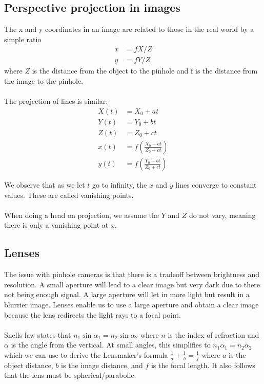\documentclass{article}
\begin{document}
\subsection*{Perspective projection in images}
The x and y coordinates in an image are related to those in the real world by a simple ratio
\begin{align*}
    x &= f X/Z \\
    y &= f Y/Z
\end{align*}
where $Z$ is the distance from the object to the pinhole and f is the distance from the image to the pinhole.
\\
\\
The projection of lines is similar:
\begin{align*}
    X(t) &= X_0 + at \\
    Y(t) &= Y_0 + bt \\
    Z(t) &= Z_0 + ct \\
    x(t) &= f\left(\frac{X_0 + at}{Z_0 + ct}\right)\\
    y(t) &= f\left(\frac{Y_0 + bt}{Z_0 + ct}\right)
\end{align*}

We observe that as we let $t$ go to infinity, the $x$ and $y$ lines converge to constant values. These are called vanishing points.
\\
\\
When doing a head on projection, we assume the $Y$ and $Z$ do not vary, meaning there is only a vanishing point at $x$.
\subsection*{Lenses}
The issue with pinhole cameras is that there is a tradeoff between brightness and resolution. A small aperture will lead to a clear image but very dark due to there not being enough signal. A large aperture will let in more light but result in a blurrier image. Lenses enable us to use a large aperture and obtain a clear image because the lens redirects the light rays to a focal point.
\\
\\
Snells law states that $n_1 \sin \alpha_1 = n_2 \sin \alpha_2$ where $n$ is the index of refraction and $\alpha$ is the angle from the vertical. At small angles, this simplifies to $n_1 \alpha_1 = n_2 \alpha_2$ which we can use to derive the Lensmaker's formula $\frac{1}{a} + \frac{1}{b} = \frac{1}{f}$ where $a$ is the object distance, $b$ is the image distance, and $f$ is the focal length. It also follows that the lens must be spherical/parabolic.
\end{document}
